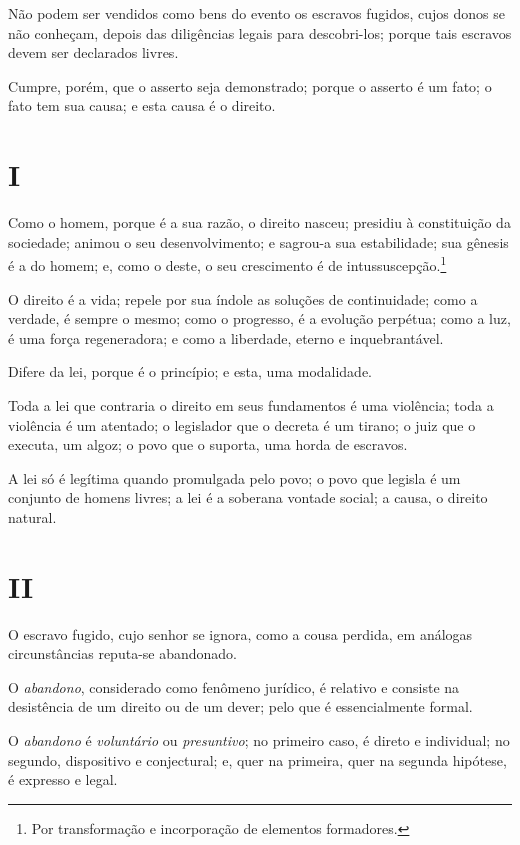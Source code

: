 Não podem ser vendidos como bens do evento os escravos fugidos, cujos
donos se não conheçam, depois das diligências legais para descobri-los;
porque tais escravos devem ser declarados livres.

Cumpre, porém, que o asserto seja demonstrado; porque o asserto é um
fato; o fato tem sua causa; e esta causa é o direito.

\section*{I}

Como o homem, porque é a sua razão, o direito nasceu; presidiu à
constituição da sociedade; animou o seu desenvolvimento; e sagrou-a sua
estabilidade; sua gênesis é a do homem; e, como o deste, o seu
crescimento é de intussuscepção.\footnote{Por transformação e
  incorporação de elementos formadores.}

O direito é a vida; repele por sua índole as soluções de continuidade;
como a verdade, é sempre o mesmo; como o progresso, é a evolução
perpétua; como a luz, é uma força regeneradora; e como a liberdade,
eterno e inquebrantável.

Difere da lei, porque é o princípio; e esta, uma modalidade.

Toda a lei que contraria o direito em seus fundamentos é uma violência;
toda a violência é um atentado; o legislador que o decreta é um tirano;
o juiz que o executa, um algoz; o povo que o suporta, uma horda de
escravos.

A lei só é legítima quando promulgada pelo povo; o povo que legisla é um
conjunto de homens livres; a lei é a soberana vontade social; a causa, o
direito natural.

\section*{II}

O escravo fugido, cujo senhor se ignora, como a cousa perdida, em
análogas circunstâncias reputa-se abandonado.

O \emph{abandono}, considerado como fenômeno jurídico, é relativo e
consiste na desistência de um direito ou de um dever; pelo que é
essencialmente formal.

O \emph{abandono} é \emph{voluntário} ou \emph{presuntivo}; no primeiro
caso, é direto e individual; no segundo, dispositivo e conjectural; e,
quer na primeira, quer na segunda hipótese, é expresso e legal.

